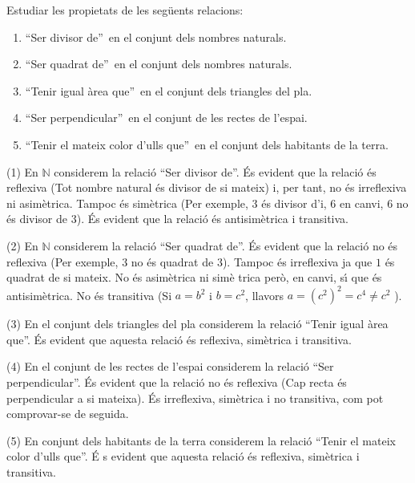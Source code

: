 \begin{exercici}
Estudiar les propietats de les seg\"{u}ents relacions:

\begin{enumerate}
\item \textquotedblleft Ser divisor de\textquotedblright\ en el conjunt dels
nombres naturals.

\item \textquotedblleft Ser quadrat de\textquotedblright\ en el conjunt dels
nombres naturals.

\item \textquotedblleft Tenir igual \`{a}rea que\textquotedblright\ en el
conjunt dels triangles del pla.

\item \textquotedblleft Ser perpendicular\textquotedblright\ en el conjunt
de les rectes de l'espai.

\item \textquotedblleft Tenir el mateix color d'ulls que\textquotedblright\
en el conjunt dels habitants de la terra.
\end{enumerate}
\end{exercici}

\begin{solucio}
(1) En $\mathbb{N}$ considerem la relaci\'{o} \textquotedblleft Ser divisor
de\textquotedblright . \'{E}s evident que la relaci\'{o} \'{e}s reflexiva
(Tot nombre natural \'{e}s divisor de si mateix) i, per tant, no \'{e}s
irreflexiva ni asim\`{e}trica. Tampoc \'{e}s sim\`{e}trica (Per exemple, $3$
\'{e}s divisor d'i, $6$ en canvi, $6$ no \'{e}s divisor de $3$). \'{E}s
evident que la relaci\'{o} \'{e}s antisim\`{e}trica i transitiva.

(2) En $\mathbb{N}$ considerem la relaci\'{o} \textquotedblleft Ser quadrat
de\textquotedblright . \'{E}s evident que la relaci\'{o} no \'{e}s reflexiva
(Per exemple, $3$ no \'{e}s quadrat de $3$). Tampoc \'{e}s irreflexiva ja
que $1$ \'{e}s quadrat de si mateix. No \'{e}s asim\`{e}trica ni sim\`{e}%
trica per\`{o}, en canvi, s\'{\i} que \'{e}s antisim\`{e}trica. No \'{e}s
transitiva (Si $a=b^{2}$ i $b=c^{2}$, llavors $a=(c^{2})^{2}=c^{4}\neq c^{2}$%
).

(3) En el conjunt dels triangles del pla considerem la relaci\'{o}
\textquotedblleft Tenir igual \`{a}rea que\textquotedblright . \'{E}s
evident que aquesta relaci\'{o} \'{e}s reflexiva, sim\`{e}trica i transitiva.

(4) En el conjunt de les rectes de l'espai considerem la relaci\'{o}
\textquotedblleft Ser perpendicular\textquotedblright . \'{E}s evident que
la relaci\'{o} no \'{e}s reflexiva (Cap recta \'{e}s perpendicular a si
mateixa). \'{E}s irreflexiva, sim\`{e}trica i no transitiva, com pot
comprovar-se de seguida.

(5) En conjunt dels habitants de la terra considerem la relaci\'{o}
\textquotedblleft Tenir el mateix color d'ulls que\textquotedblright . \'{E}%
s evident que aquesta relaci\'{o} \'{e}s reflexiva, sim\`{e}trica i
transitiva.
\end{solucio}


